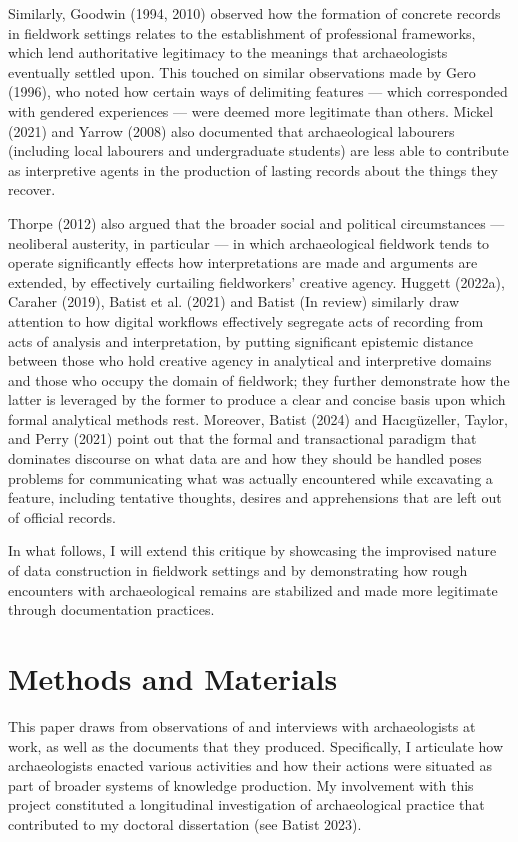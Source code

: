 \documentclass[
]{article}
\begin{document}
Similarly, Goodwin (1994, 2010) observed how the formation of concrete
records in fieldwork settings relates to the establishment of
professional frameworks, which lend authoritative legitimacy to the
meanings that archaeologists eventually settled upon. This touched on
similar observations made by Gero (1996), who noted how certain ways of
delimiting features --- which corresponded with gendered experiences ---
were deemed more legitimate than others. Mickel (2021) and Yarrow (2008)
also documented that archaeological labourers (including local labourers
and undergraduate students) are less able to contribute as interpretive
agents in the production of lasting records about the things they
recover.

Thorpe (2012) also argued that the broader social and political
circumstances --- neoliberal austerity, in particular --- in which
archaeological fieldwork tends to operate significantly effects how
interpretations are made and arguments are extended, by effectively
curtailing fieldworkers' creative agency. Huggett (2022a), Caraher
(2019), Batist et al. (2021) and Batist (In review) similarly draw
attention to how digital workflows effectively segregate acts of
recording from acts of analysis and interpretation, by putting
significant epistemic distance between those who hold creative agency in
analytical and interpretive domains and those who occupy the domain of
fieldwork; they further demonstrate how the latter is leveraged by the
former to produce a clear and concise basis upon which formal analytical
methods rest. Moreover, Batist (2024) and Hacıgüzeller, Taylor, and
Perry (2021) point out that the formal and transactional paradigm that
dominates discourse on what data are and how they should be handled
poses problems for communicating what was actually encountered while
excavating a feature, including tentative thoughts, desires and
apprehensions that are left out of official records.

In what follows, I will extend this critique by showcasing the
improvised nature of data construction in fieldwork settings and by
demonstrating how rough encounters with archaeological remains are
stabilized and made more legitimate through documentation practices.

\section{Methods and Materials}\label{methods-and-materials}

This paper draws from observations of and interviews with archaeologists
at work, as well as the documents that they produced. Specifically, I
articulate how archaeologists enacted various activities and how their
actions were situated as part of broader systems of knowledge
production. My involvement with this project constituted a longitudinal
investigation of archaeological practice that contributed to my doctoral
dissertation (see Batist 2023).
\end{document}
